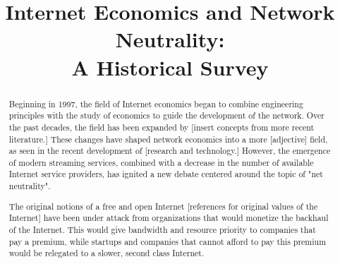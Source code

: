 \documentclass[conference]{IEEEtran}
\begin{document}
\title{Internet Economics and Network Neutrality:\\
 A Historical Survey}

\author{
\and
{}
\and
{}
}

\maketitle

\begin{abstract}
Beginning in 1997, the field of Internet economics began to combine engineering principles with the study of economics to guide the development of the network. Over the past decades, the field has been expanded by [insert concepts from more recent literature.] These changes have shaped network economics into a more [adjective] field, as seen in the recent development of [research and technology.] However, the emergence of modern streaming services, combined with a decrease in the number of available Internet service providers, has ignited a new debate centered around the topic of "net neutrality".

The original notions of a free and open Internet [references for original values of the Internet] have been under attack from organizations that would monetize the backhaul of the Internet. This would give bandwidth and resource priority to companies that pay a premium, while startups and companies that cannot afford to pay this premium would be relegated to a slower, second class Internet.
\end{abstract}
\end{document}
